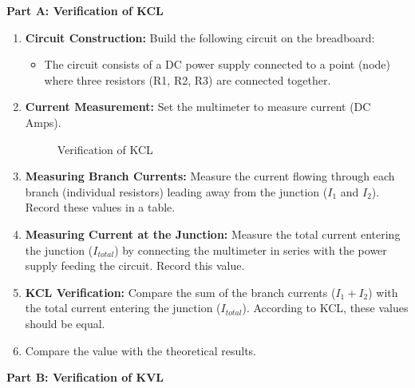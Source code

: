 \noindent \textbf{Part A: Verification of KCL}
\begin{enumerate}

    \item \textbf{Circuit Construction:} Build the following circuit on the breadboard:
    \begin{itemize}
        \item The circuit consists of a DC power supply connected to a point (node) where three resistors (R1, R2, R3) are connected together.
    \end{itemize}
    
    \item \textbf{Current Measurement:} Set the multimeter to measure current (DC Amps).

    \begin{figure}[H]
        \centering
        
        \caption{Verification of KCL}
        \label{fig:enter-label}
    \end{figure}
    
    \item \textbf{Measuring Branch Currents:} Measure the current flowing through each branch (individual resistors) leading away from the junction ($I_1$ and $I_2$). Record these values in a table.
    
    \item \textbf{Measuring Current at the Junction:} Measure the total current entering the junction ($I_{total}$) by connecting the multimeter in series with the power supply feeding the circuit. Record this value.

    \item \textbf{KCL Verification:} Compare the sum of the branch currents ($I_1 + I_2$) with the total current entering the junction ($I_{total}$). According to KCL, these values should be equal.

    \item Compare the value with the theoretical results.
\end{enumerate}

\noindent \textbf{Part B: Verification of KVL} 

